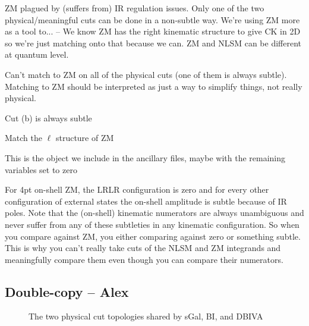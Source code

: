 \documentclass[11pt,letter]{article}
\begin{document}
ZM plagued by (suffers from) IR regulation issues.
Only one of the two physical/meaningful cuts can be done in a non-subtle way.
We're using ZM more as a tool to... -- We know ZM has the right kinematic structure to give CK in 2D so we're just matching onto that because we can.  ZM and NLSM can be different at quantum level.

Can't match to ZM on all of the physical cuts (one of them is always subtle).  Matching to ZM should be interpreted as just a way to simplify things, not really physical.

Cut (b) is always subtle

Match the $\ell$ structure of ZM

This is the object we include in the ancillary files, maybe with the remaining variables set to zero

For 4pt on-shell ZM, the LRLR configuration is zero and for every
other configuration of external states the on-shell amplitude is
subtle because of IR poles.  Note that the (on-shell) kinematic
numerators are always unambiguous and never suffer from any of these
subtleties in any kinematic configuration.  So when you compare
against ZM, you either comparing against zero or something subtle.
This is why you can't really take cuts of the NLSM and ZM integrands
and meaningfully compare them even though you can compare their
numerators.

\subsection{Double-copy -- Alex }

\begin{figure}
  \begin{center}
    \begin{subfigure}{0.45\textwidth}
      \begin{center}
        \PhysicalCutOne{}{}{}{}
      \end{center}
    \end{subfigure}
    \begin{subfigure}{0.45\textwidth}
      \begin{center}
        \PhysicalCutTwo{}{}{}{}
      \end{center}
    \end{subfigure}
  \end{center}
  \caption{The two physical cut topologies shared by sGal, BI, and DBIVA}
  \label{fig:emu}
\end{figure}
\end{document}
